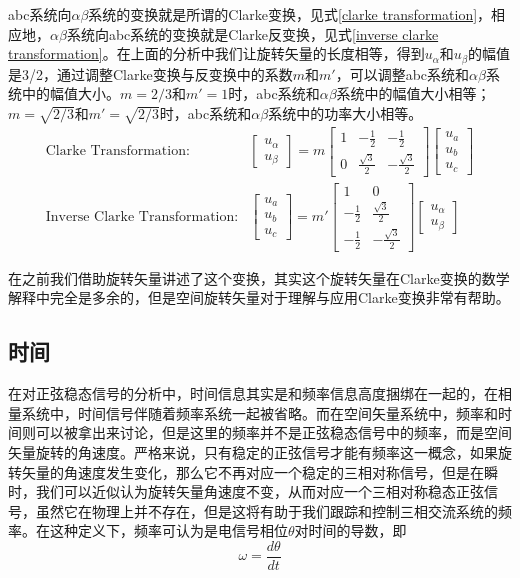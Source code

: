 \documentclass{ctexart}
\numberwithin{equation}{section}
\begin{document}
abc系统向$\alpha \beta$系统的变换就是所谓的Clarke变换，见式\ref{clarke transformation}，相应地，$\alpha \beta$系统向abc系统的变换就是Clarke反变换，见式\ref{inverse clarke transformation}。在上面的分析中我们让旋转矢量的长度相等，得到${u_{\alpha}}$和${u_{\beta}}$的幅值是3/2，通过调整Clarke变换与反变换中的系数$m$和$m'$，可以调整abc系统和$\alpha \beta$系统中的幅值大小。$m=2/3$和$m'=1$时，abc系统和$\alpha \beta$系统中的幅值大小相等；$m=\sqrt{2/3}$和$m'=\sqrt{2/3}$时，abc系统和$\alpha \beta$系统中的功率大小相等。
\begin{align}
  \text{Clarke Transformation:}
  &\begin{bmatrix}
    u_{\alpha}\\
    u_{\beta}
  \end{bmatrix}
  =
  m
  \begin{bmatrix}
    1 & -\frac{1}{2} & -\frac{1}{2}\\
    0 & \frac{\sqrt{3}}{2} & -\frac{\sqrt{3}}{2}
  \end{bmatrix}
  \begin{bmatrix}
    u_a\\
    u_b\\
    u_c
  \end{bmatrix}
  \label{clarke transformation}
  \\
  \text{Inverse Clarke Transformation:}
  &\begin{bmatrix}
    u_a\\
    u_b\\
    u_c
  \end{bmatrix}
  =
  m'
  \begin{bmatrix}
    1 & 0\\
    -\frac{1}{2} & \frac{\sqrt{3}}{2}\\
    -\frac{1}{2} & -\frac{\sqrt{3}}{2}
  \end{bmatrix}
  \begin{bmatrix}
    u_{\alpha}\\
    u_{\beta}
  \end{bmatrix}
  \label{inverse clarke transformation}
\end{align}

在之前我们借助旋转矢量讲述了这个变换，其实这个旋转矢量在Clarke变换的数学解释中完全是多余的，但是空间旋转矢量对于理解与应用Clarke变换非常有帮助。

\subsection{时间}
在对正弦稳态信号的分析中，时间信息其实是和频率信息高度捆绑在一起的，在相量系统中，时间信号伴随着频率系统一起被省略。而在空间矢量系统中，频率和时间则可以被拿出来讨论，但是这里的频率并不是正弦稳态信号中的频率，而是空间矢量旋转的角速度。严格来说，只有稳定的正弦信号才能有频率这一概念，如果旋转矢量的角速度发生变化，那么它不再对应一个稳定的三相对称信号，但是在瞬时，我们可以近似认为旋转矢量角速度不变，从而对应一个三相对称稳态正弦信号，虽然它在物理上并不存在，但是这将有助于我们跟踪和控制三相交流系统的频率。在这种定义下，频率可认为是电信号相位$\theta$对时间的导数，即
\begin{equation}
  \omega = \frac{d\theta}{dt}
\end{equation}
\end{document}
